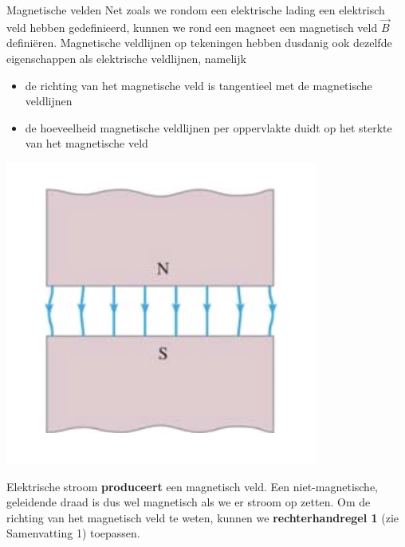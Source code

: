 \begin{theo}{Magnetische velden}
    Net zoals we rondom een elektrische lading een elektrisch veld hebben gedefinieerd, kunnen we rond een magneet een magnetisch veld
    $\Vec{B}$ definiëren. Magnetische veldlijnen op tekeningen hebben dusdanig ook dezelfde eigenschappen als elektrische veldlijnen, namelijk

    \begin{minipage}{.7\textwidth}
        \begin{itemize}
            \item de richting van het magnetische veld is tangentieel met de magnetische veldlijnen
            \item de hoeveelheid magnetische veldlijnen per oppervlakte duidt op het sterkte van het magnetische veld
        \end{itemize}

    \end{minipage}
    \begin{minipage}{.24\textwidth}
        \includegraphics[scale = 0.52]{Images/Magnetisme/HomogeenMagnetischVeld}
    \end{minipage}

    \noindent Elektrische stroom \textbf{produceert} een magnetisch veld. Een niet-magnetische, geleidende draad is dus wel magnetisch als we er stroom op zetten.
    Om de richting van het magnetisch veld te weten, kunnen we \textbf{rechterhandregel 1} (zie Samenvatting 1) toepassen.


\end{theo}

